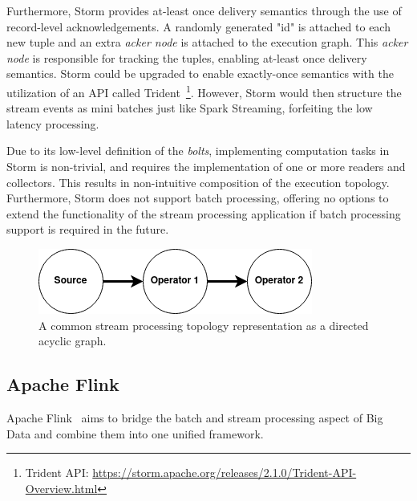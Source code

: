 Furthermore, Storm provides at-least once 
delivery semantics through the use of record-level acknowledgements. A randomly 
generated "id" is attached to each new tuple and an extra \emph{acker node} is attached 
to the execution graph. This \emph{acker node} is responsible for tracking the tuples, 
enabling at-least once delivery semantics. Storm could be upgraded to enable 
exactly-once semantics with the utilization of an API called
Trident~\footnote{Trident API: \url{https://storm.apache.org/releases/2.1.0/Trident-API-Overview.html}}. 
However, Storm would then structure the stream events as mini batches just like 
Spark Streaming, forfeiting the low latency processing. 

Due to its low-level definition of the \emph{bolts}, implementing computation tasks 
in Storm is non-trivial, and requires the implementation of one or more readers and 
collectors. This results in non-intuitive composition of the execution topology. 
Furthermore, Storm does not support 
batch processing, offering no options to extend the functionality of the stream 
processing application if batch processing support is required in the future. 


\begin{figure}[!htpb]
    \centering
    \includegraphics[width=0.5\linewidth]{fig/dag.png}
    \caption{A common stream processing topology representation as a directed acyclic graph.} 
    \label{fig:dag_topology}
\end{figure}

\subsection{Apache Flink}%
\label{sub:Apache Flink}

Apache Flink~\cite{flink} aims to bridge the batch and stream processing aspect of 
Big Data and combine them into one unified framework.   

